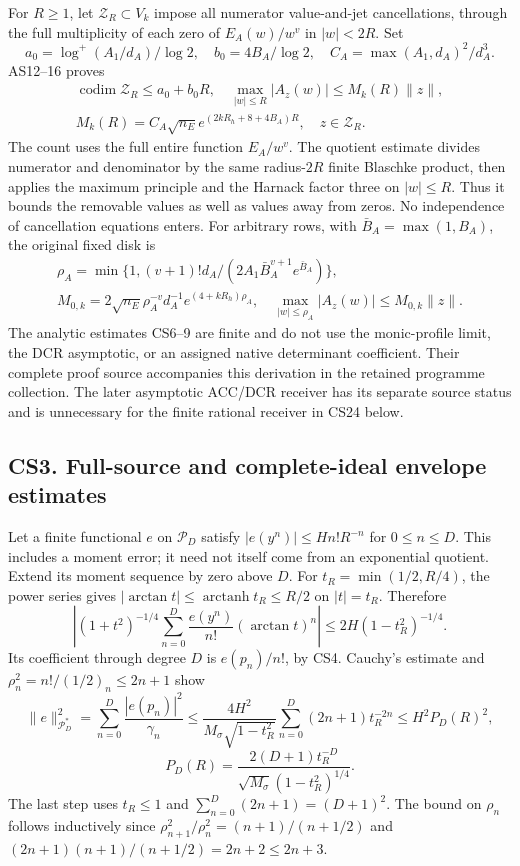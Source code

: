 \documentclass[11pt]{article}
\begin{document}
For \(R\ge1\), let \(\mathcal Z_R\subset V_k\) impose all numerator value-and-jet cancellations, through the full multiplicity of each zero of \(E_A(w)/w^v\) in \(|w|<2R\). Set \[
 a_0=\log^+(A_1/d_A)/\log2,\quad b_0=4B_A/\log2,\quad
 C_A=\max(A_1,d_A)^2/d_A^3.
\] AS12--16 proves \[
\begin{gathered}
 \operatorname{codim}\mathcal Z_R\le a_0+b_0R,\quad \max_{|w|\le R}|A_z(w)|\le M_k(R)\|z\|,\\
 M_k(R)=C_A\sqrt{n_E}e^{(2kR_h+8+4B_A)R},\quad z\in\mathcal Z_R.
\end{gathered}
 \tag{CS8}
\] The count uses the full entire function \(E_A/w^v\). The quotient estimate divides numerator and denominator by the same radius-\(2R\) finite Blaschke product, then applies the maximum principle and the Harnack factor three on \(|w|\le R\). Thus it bounds the removable values as well as values away from zeros. No independence of cancellation equations enters. For arbitrary rows, with \(\bar B_A=\max(1,B_A)\), the original fixed disk is \[
\begin{gathered}
 \rho_A=\min\{1,(v+1)!d_A/(2A_1\bar B_A^{v+1}e^{\bar B_A})\},\\
 M_{0,k}=2\sqrt{n_E}\rho_A^{-v}d_A^{-1}e^{(4+kR_h)\rho_A},\quad
 \max_{|w|\le\rho_A}|A_z(w)|\le M_{0,k}\|z\|.
\end{gathered}
 \tag{CS9}
\] The analytic estimates CS6--9 are finite and do not use the monic-profile limit, the DCR asymptotic, or an assigned native determinant coefficient. Their complete proof source accompanies this derivation in the retained programme collection. The later asymptotic ACC/DCR receiver has its separate source status and is unnecessary for the finite rational receiver in CS24 below.

\subsection{CS3. Full-source and complete-ideal envelope estimates}\label{cs3.-full-source-and-complete-ideal-envelope-estimates}

Let a finite functional \(e\) on \(\mathcal P_D\) satisfy \(|e(y^n)|\le Hn!R^{-n}\) for \(0\le n\le D\). This includes a moment error; it need not itself come from an exponential quotient. Extend its moment sequence by zero above \(D\). For \(t_R=\min(1/2,R/4)\), the power series gives \(|\arctan t|\le\operatorname{arctanh}t_R\le R/2\) on \(|t|=t_R\). Therefore \[
 \left|(1+t^2)^{-1/4}\sum_{n=0}^D\frac{e(y^n)}{n!}(\arctan t)^n\right|
 \le2H(1-t_R^2)^{-1/4}.
\] Its coefficient through degree \(D\) is \(e(p_n)/n!\), by CS4. Cauchy's estimate and \(\rho_n^2=n!/(1/2)_n\le2n+1\) show \[
 \|e\|_{\mathcal P_D^*}^2=\sum_{n=0}^D\frac{|e(p_n)|^2}{\gamma_n}
 \le\frac{4H^2}{M_\sigma\sqrt{1-t_R^2}}\sum_{n=0}^D(2n+1)t_R^{-2n}
 \le H^2P_D(R)^2,
\] \[
 P_D(R)=\frac{2(D+1)t_R^{-D}}{\sqrt{M_\sigma}(1-t_R^2)^{1/4}}.
 \tag{CS10}
\] The last step uses \(t_R\le1\) and \(\sum_{n=0}^D(2n+1)=(D+1)^2\). The bound on \(\rho_n\) follows inductively since \(\rho_{n+1}^2/\rho_n^2=(n+1)/(n+1/2)\) and \((2n+1)(n+1)/(n+1/2)=2n+2\le2n+3\).
\end{document}
